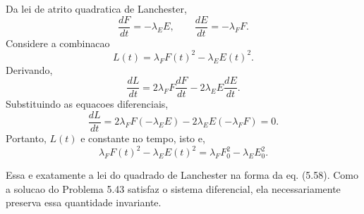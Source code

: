 Da lei de atrito quadratica de Lanchester,
\[
\frac{dF}{dt}=-\lambda_EE,
\qquad
\frac{dE}{dt}=-\lambda_FF.
\]
Considere a combinacao
\[
L(t)=\lambda_FF(t)^2-\lambda_EE(t)^2.
\]
Derivando,
\[
\frac{dL}{dt}=2\lambda_FF\frac{dF}{dt}-2\lambda_EE\frac{dE}{dt}.
\]
Substituindo as equacoes diferenciais,
\[
\frac{dL}{dt}=2\lambda_FF(-\lambda_EE)-2\lambda_EE(-\lambda_FF)=0.
\]
Portanto, $L(t)$ e constante no tempo, isto e,
\[
\lambda_FF(t)^2-\lambda_EE(t)^2=\lambda_FF_0^2-\lambda_EE_0^2.
\]

Essa e exatamente a lei do quadrado de Lanchester na forma da eq. (5.58). Como a solucao do Problema 5.43 satisfaz o sistema diferencial, ela necessariamente preserva essa quantidade invariante.